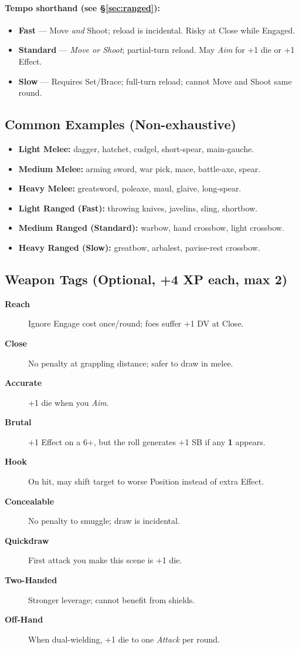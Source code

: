 \paragraph{Tempo shorthand (see \S\ref{sec:ranged}):}
\begin{itemize}
  \item \textbf{Fast} — Move \emph{and} Shoot; reload is incidental. Risky at Close while Engaged.
  \item \textbf{Standard} — \emph{Move or Shoot}; partial-turn reload. May \emph{Aim} for +1 die or +1 Effect.
  \item \textbf{Slow} — Requires Set/Brace; full-turn reload; cannot Move and Shoot same round.
\end{itemize}

\subsection*{Common Examples (Non-exhaustive)}
\begin{itemize}
  \item \textbf{Light Melee:} dagger, hatchet, cudgel, short-spear, main-gauche.
  \item \textbf{Medium Melee:} arming sword, war pick, mace, battle-axe, spear.
  \item \textbf{Heavy Melee:} greatsword, poleaxe, maul, glaive, long-spear.
  \item \textbf{Light Ranged (Fast):} throwing knives, javelins, sling, shortbow.
  \item \textbf{Medium Ranged (Standard):} warbow, hand crossbow, light crossbow.
  \item \textbf{Heavy Ranged (Slow):} greatbow, arbalest, pavise-rest crossbow.
\end{itemize}

\subsection*{Weapon Tags (Optional, +4 XP each, max 2)}
\label{app:weapon-tags}
\begin{description}
  \item[\textbf{Reach}] Ignore Engage cost once/round; foes suffer +1 DV at Close.
  \item[\textbf{Close}] No penalty at grappling distance; safer to draw in melee.
  \item[\textbf{Accurate}] +1 die when you \emph{Aim}.
  \item[\textbf{Brutal}] +1 Effect on a 6+, but the roll generates +1 SB if any \textbf{1} appears.
  \item[\textbf{Hook}] On hit, may shift target to worse Position instead of extra Effect.
  \item[\textbf{Concealable}] No penalty to smuggle; draw is incidental.
  \item[\textbf{Quickdraw}] First attack you make this scene is +1 die.
  \item[\textbf{Two-Handed}] Stronger leverage; cannot benefit from shields.
  \item[\textbf{Off-Hand}] When dual-wielding, +1 die to one \emph{Attack} per round.
\end{description}

